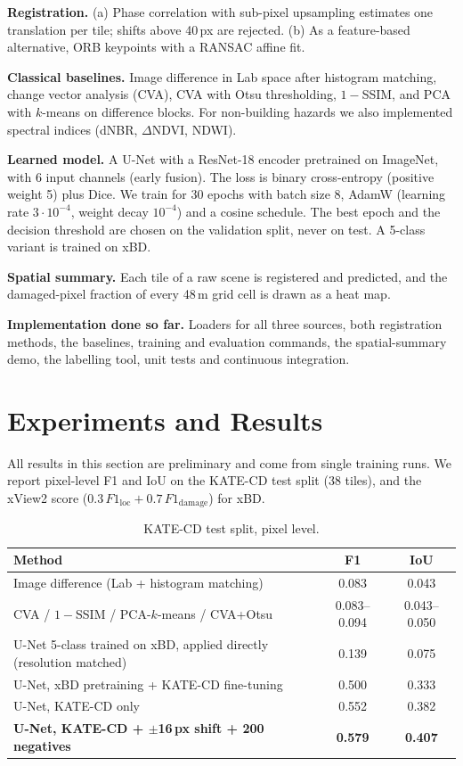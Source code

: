 \documentclass[14pt]{article}
\begin{document}
\textbf{Registration.} (a) Phase correlation with sub-pixel upsampling \citep{guizar2008} estimates one translation per tile; shifts above 40\,px are rejected. (b) As a feature-based alternative, ORB keypoints \citep{rublee2011orb} with a RANSAC \citep{fischler1981ransac} affine fit.

\textbf{Classical baselines.} Image difference in Lab space after histogram matching, change vector analysis (CVA), CVA with Otsu thresholding, $1-$SSIM, and PCA with $k$-means on difference blocks. For non-building hazards we also implemented spectral indices (dNBR, $\Delta$NDVI, NDWI).

\textbf{Learned model.} A U-Net with a ResNet-18 encoder \citep{he2015resnet} pretrained on ImageNet, with 6 input channels (early fusion). The loss is binary cross-entropy (positive weight 5) plus Dice. We train for 30 epochs with batch size 8, AdamW (learning rate $3\cdot10^{-4}$, weight decay $10^{-4}$) and a cosine schedule. The best epoch and the decision threshold are chosen on the validation split, never on test. A 5-class variant is trained on xBD.

\textbf{Spatial summary.} Each tile of a raw scene is registered and predicted, and the damaged-pixel fraction of every 48\,m grid cell is drawn as a heat map.

\textbf{Implementation done so far.} Loaders for all three sources, both registration methods, the baselines, training and evaluation commands, the spatial-summary demo, the labelling tool, unit tests and continuous integration.

\section{Experiments and Results}
All results in this section are preliminary and come from single training runs. We report pixel-level F1 and IoU on the KATE-CD test split (38 tiles), and the xView2 score ($0.3\,F1_{\mathrm{loc}} + 0.7\,F1_{\mathrm{damage}}$) for xBD.

\begin{table}[H]
\centering\small
\caption{KATE-CD test split, pixel level.}\label{tab:kate}
\begin{tabular}{@{}lcc@{}}
\toprule
Method & F1 & IoU\\
\midrule
Image difference (Lab + histogram matching) & 0.083 & 0.043\\
CVA / $1-$SSIM / PCA-$k$-means / CVA+Otsu & 0.083--0.094 & 0.043--0.050\\
U-Net 5-class trained on xBD, applied directly (resolution matched) & 0.139 & 0.075\\
U-Net, xBD pretraining + KATE-CD fine-tuning & 0.500 & 0.333\\
U-Net, KATE-CD only & 0.552 & 0.382\\
\textbf{U-Net, KATE-CD + $\pm$16\,px shift + 200 negatives} & \textbf{0.579} & \textbf{0.407}\\
\bottomrule
\end{tabular}
\end{table}
\end{document}
